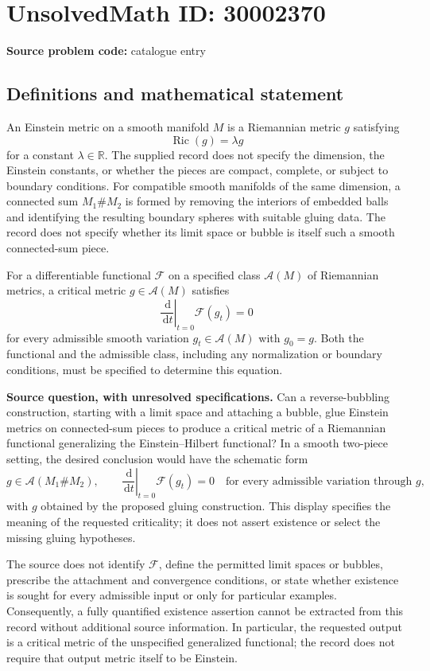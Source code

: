 \documentclass[11pt]{article}
\newcommand{\R}{\mathbb{R}}
\newcommand{\dd}{\,\mathrm{d}}
\begin{document}
\section*{UnsolvedMath ID: 30002370}
\textbf{Source problem code:} catalogue entry
\subsection{Definitions and mathematical statement}
An Einstein metric on a smooth manifold \(M\) is a Riemannian metric \(g\) satisfying
\[
\operatorname{Ric}(g)=\lambda g
\]
for a constant \(\lambda\in\R\). The supplied record does not specify the dimension, the Einstein constants, or whether the pieces are compact, complete, or subject to boundary conditions. For compatible smooth manifolds of the same dimension, a connected sum \(M_1\#M_2\) is formed by removing the interiors of embedded balls and identifying the resulting boundary spheres with suitable gluing data. The record does not specify whether its limit space or bubble is itself such a smooth connected-sum piece.

For a differentiable functional \(\mathcal F\) on a specified class \(\mathcal A(M)\) of Riemannian metrics, a critical metric \(g\in\mathcal A(M)\) satisfies
\[
\left.\frac{\dd}{\dd t}\right|_{t=0}\mathcal F(g_t)=0
\]
for every admissible smooth variation \(g_t\in\mathcal A(M)\) with \(g_0=g\). Both the functional and the admissible class, including any normalization or boundary conditions, must be specified to determine this equation.

\textbf{Source question, with unresolved specifications.} Can a reverse-bubbling construction, starting with a limit space and attaching a bubble, glue Einstein metrics on connected-sum pieces to produce a critical metric of a Riemannian functional generalizing the Einstein--Hilbert functional? In a smooth two-piece setting, the desired conclusion would have the schematic form
\[
 g\in\mathcal A(M_1\#M_2),\qquad
 \left.\frac{\dd}{\dd t}\right|_{t=0}\mathcal F(g_t)=0
 \quad\text{for every admissible variation through }g,
\]
with \(g\) obtained by the proposed gluing construction. This display specifies the meaning of the requested criticality; it does not assert existence or select the missing gluing hypotheses.

The source does not identify \(\mathcal F\), define the permitted limit spaces or bubbles, prescribe the attachment and convergence conditions, or state whether existence is sought for every admissible input or only for particular examples. Consequently, a fully quantified existence assertion cannot be extracted from this record without additional source information. In particular, the requested output is a critical metric of the unspecified generalized functional; the record does not require that output metric itself to be Einstein.
\end{document}
